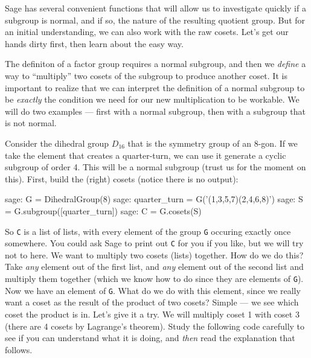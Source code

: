 Sage has several convenient functions that will allow us to investigate quickly if a subgroup is normal, and if so, the nature of the resulting quotient group.  But for an initial understanding, we can also work with the raw cosets.  Let's get our hands dirty first, then learn about the easy way.\par
%
%
The definiton of a factor group requires a normal subgroup, and then we \emph{define} a way to ``multiply'' two cosets of the subgroup to produce another coset.  It is important to realize that we can interpret the definition of a normal subgroup to be \emph{exactly} the condition we need for our new multiplication to be workable.  We will do two examples --- first with a normal subgroup, then with a subgroup that is not normal.\par
%
Consider the dihedral group $D_{16}$ that is the symmetry group of an $8$-gon.  If we take the element that creates a quarter-turn, we can use it generate a cyclic subgroup of order 4.  This will be a normal subgroup (trust us for the moment on this).  First, build the (right) cosets (notice there is no output):
%
\begin{sageexample}
sage: G = DihedralGroup(8)
sage: quarter_turn = G('(1,3,5,7)(2,4,6,8)')
sage: S = G.subgroup([quarter_turn])
sage: C = G.cosets(S)
\end{sageexample}
%
So \verb?C? is a list of lists, with every element of the group \verb?G? occuring exactly once somewhere.  You could ask Sage to print out \verb?C? for you if you like, but we will try not to here.  We want to multiply two cosets (lists) together.  How do we do this?  Take \emph{any} element out of the first list, and \emph{any} element out of the second list and multiply them together (which we know how to do since they are elements of \verb?G?).  Now we have an element of \verb?G?.  What do we do with this element, since we really want a coset as the result of the product of two cosets?  Simple --- we see which coset the product is in.  Let's give it a try.  We will multiply coset 1 with coset 3 (there are 4 cosets by Lagrange's theorem).  Study the following code carefully to see if you can understand what it is doing, and \emph{then} read the explanation that follows.
